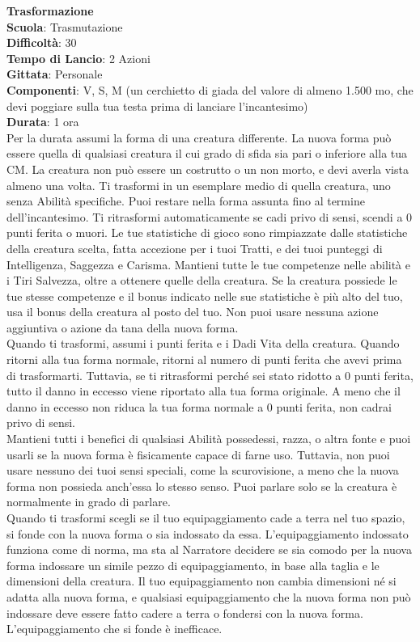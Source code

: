 \begin{multicols}{2}
\medskip\textbf{Trasformazione}\\
\textbf{Scuola}: Trasmutazione\\
\textbf{Difficoltà}: 30\\
\textbf{Tempo di Lancio}: 2 Azioni\\
\textbf{Gittata}: Personale\\
\textbf{Componenti}: V, S, M (un cerchietto di giada del valore di almeno 1.500 mo, che devi poggiare sulla tua testa prima di lanciare l'incantesimo)\\
\textbf{Durata}: 1 ora\\
Per la durata assumi la forma di una creatura differente. La nuova forma può essere quella di qualsiasi creatura il cui grado di sfida sia pari o inferiore alla tua CM. La creatura non può essere un costrutto o un non morto, e devi averla vista almeno una volta. Ti trasformi in un esemplare medio di quella creatura, uno senza Abilità specifiche. Puoi restare nella forma assunta fino al termine dell'incantesimo. Ti ritrasformi automaticamente se cadi privo di sensi, scendi a 0 punti ferita o muori. Le tue statistiche di gioco sono rimpiazzate dalle statistiche della creatura scelta, fatta accezione per i tuoi Tratti, e dei tuoi punteggi di Intelligenza, Saggezza e Carisma. Mantieni tutte le tue competenze nelle abilità e i Tiri Salvezza, oltre a ottenere quelle della creatura. Se la creatura possiede le tue stesse competenze e il bonus indicato nelle sue statistiche è più alto del tuo, usa il bonus della creatura al posto del tuo. Non puoi usare nessuna azione aggiuntiva o azione da tana della nuova forma.\\
Quando ti trasformi, assumi i punti ferita e i Dadi Vita della creatura. Quando ritorni alla tua forma normale, ritorni al numero di punti ferita che avevi prima di trasformarti. Tuttavia, se ti ritrasformi perché sei stato ridotto a 0 punti ferita, tutto il danno in eccesso viene riportato alla tua forma originale. A meno che il danno in eccesso non riduca la tua forma normale a 0 punti ferita, non cadrai privo di sensi. \\
Mantieni tutti i benefici di qualsiasi Abilità possedessi, razza, o altra fonte e puoi usarli se la nuova forma è fisicamente capace di farne uso. Tuttavia, non puoi usare nessuno dei tuoi sensi speciali, come la scurovisione, a meno che la nuova forma non possieda anch'essa lo stesso senso. Puoi parlare solo se la creatura è normalmente in grado di parlare.\\
Quando ti trasformi scegli se il tuo equipaggiamento cade a terra nel tuo spazio, si fonde con la nuova forma o sia indossato da essa. L'equipaggiamento indossato funziona come di norma, ma sta al Narratore decidere se sia comodo per la nuova forma indossare un simile pezzo di equipaggiamento, in base alla taglia e le dimensioni della creatura. Il tuo equipaggiamento non cambia dimensioni né si adatta alla nuova forma, e qualsiasi equipaggiamento che la nuova forma non può indossare deve essere fatto cadere a terra o fondersi con la nuova forma. L'equipaggiamento che si fonde è inefficace.\\

\end{multicols}
